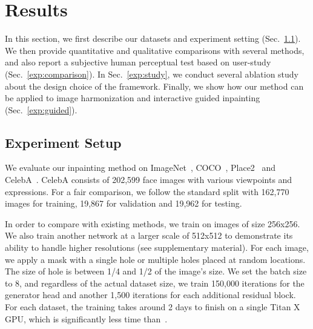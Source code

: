 \section{Results}
\label{sec:results}
In this section, we first describe our datasets and experiment setting (Sec.~\ref{exp:setup}). We then provide quantitative and qualitative comparisons with several methods, and also report a subjective human perceptual test based on user-study (Sec.~\ref{exp:comparison}). In Sec.~\ref{exp:study}, we conduct several ablation study about the design choice of the framework. Finally, we show how our method can be applied to image harmonization and interactive guided inpainting (Sec.~\ref{exp:guided}).

\subsection{Experiment Setup}
\label{exp:setup}
We evaluate our inpainting method on ImageNet~\cite{russakovsky2015imagenet}, COCO~\cite{lin2014microsoft}, Place2~\cite{zhou2016places} and CelebA~\cite{liu2015faceattributes}. CelebA consists of 202,599 face images with various viewpoints and expressions. For a fair comparison, we follow the standard split with 162,770 images for training, 19,867 for validation and 19,962 for testing.

In order to compare with existing methods, we train on images of size 256x256. We also train another network at a larger scale of 512x512 to demonstrate its ability to handle higher resolutions (see supplementary material). For each image, we apply a mask with a single hole or multiple holes placed at random locations. The size of hole is between 1/4 and 1/2 of the image's size. We set the batch size to 8, and regardless of the actual dataset size, we train 150,000 iterations for the generator head and another 1,500 iterations for each additional residual block. For each dataset, the training takes around 2 days to finish on a single Titan X GPU, which is significantly less time than~\cite{iizuka2017globally}.

